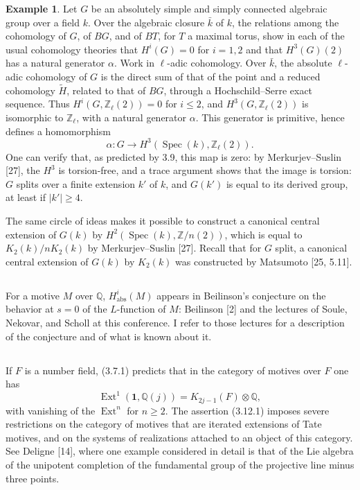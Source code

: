 \documentclass[11pt,a4paper]{article}
\theoremstyle{plain}
\theoremstyle{definition}
\newtheorem{example}[theorem]{Example}
\DeclareMathOperator{\Ext}{Ext}
\DeclareMathOperator{\Spec}{Spec}
\newcommand{\Q}{\mathbb{Q}}
\newcommand{\Z}{\mathbb{Z}}
\newcommand{\abs}{\mathrm{abs}}
\begin{document}
\begin{example}
Let $G$ be an absolutely simple and simply connected algebraic group over a field $k$. Over the algebraic closure $\bar{k}$ of $k$, the relations among the cohomology of $G$, of $BG$, and of $BT$, for $T$ a maximal torus, show in each of the usual cohomology theories that $H^i(G)=0$ for $i=1,2$ and that $H^3(G)(2)$ has a natural generator $\alpha$. Work in $\ell$-adic cohomology. Over $\bar{k}$, the absolute $\ell$-adic cohomology of $G$ is the direct sum of that of the point and a reduced cohomology $\tilde H$, related to that of $BG$, through a Hochschild--Serre exact sequence. Thus $H^i(G,\Z_\ell(2))=0$ for $i\leq2$, and $H^3(G,\Z_\ell(2))$ is isomorphic to $\Z_\ell$, with a natural generator $\alpha$. This generator is primitive, hence defines a homomorphism
$$
\alpha:G\to H^3(\Spec(k),\Z_\ell(2)).
$$
One can verify that, as predicted by 3.9, this map is zero: by Merkurjev--Suslin [27], the $H^3$ is torsion-free, and a trace argument shows that the image is torsion: $G$ splits over a finite extension $k'$ of $k$, and $G(k')$ is equal to its derived group, at least if $|k'|\geq4$.

The same circle of ideas makes it possible to construct a canonical central extension of $G(k)$ by $H^2(\Spec(k),\Z/n(2))$, which is equal to $K_2(k)/nK_2(k)$ by Merkurjev--Suslin [27]. Recall that for $G$ split, a canonical central extension of $G(k)$ by $K_2(k)$ was constructed by Matsumoto [25, 5.11].
\end{example}

\subsection{}

For a motive $M$ over $\Q$, $H^i_{\abs}(M)$ appears in Beilinson's conjecture on the behavior at $s=0$ of the $L$-function of $M$: Beilinson [2] and the lectures of Soule, Nekovar, and Scholl at this conference. I refer to those lectures for a description of the conjecture and of what is known about it.

\subsection{}

If $F$ is a number field, (3.7.1) predicts that in the category of motives over $F$ one has
\begin{equation}
\tag{3.12.1}
\Ext^1(\mathbf{1},\Q(j))=K_{2j-1}(F)\otimes\Q,
\end{equation}
with vanishing of the $\Ext^n$ for $n\geq2$. The assertion (3.12.1) imposes severe restrictions on the category of motives that are iterated extensions of Tate motives, and on the systems of realizations attached to an object of this category. See Deligne [14], where one example considered in detail is that of the Lie algebra of the unipotent completion of the fundamental group of the projective line minus three points.
\end{document}
